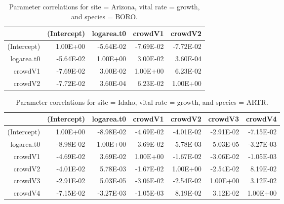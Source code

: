 \documentclass[12pt,]{article}
\begin{document}
\begin{table}[ht]
\centering
\caption{Parameter correlations for site = Arizona, vital rate = growth, and species = BORO.} 
\begin{tabular}{rrrrr}
  \hline
 & (Intercept) & logarea.t0 & crowdV1 & crowdV2 \\ 
  \hline
(Intercept) & 1.00E+00 & -5.64E-02 & -7.69E-02 & -7.72E-02 \\ 
  logarea.t0 & -5.64E-02 & 1.00E+00 & 3.00E-02 & 3.60E-04 \\ 
  crowdV1 & -7.69E-02 & 3.00E-02 & 1.00E+00 & 6.23E-02 \\ 
  crowdV2 & -7.72E-02 & 3.60E-04 & 6.23E-02 & 1.00E+00 \\ 
   \hline
\end{tabular}
\end{table}

\begin{table}[ht]
\centering
\caption{Parameter correlations for site = Idaho, vital rate = growth, and species = ARTR.} 
\begin{tabular}{rrrrrrr}
  \hline
 & (Intercept) & logarea.t0 & crowdV1 & crowdV2 & crowdV3 & crowdV4 \\ 
  \hline
(Intercept) & 1.00E+00 & -8.98E-02 & -4.69E-02 & -4.01E-02 & -2.91E-02 & -7.15E-02 \\ 
  logarea.t0 & -8.98E-02 & 1.00E+00 & 3.69E-02 & 5.78E-03 & 5.03E-05 & -3.27E-03 \\ 
  crowdV1 & -4.69E-02 & 3.69E-02 & 1.00E+00 & -1.67E-02 & -3.06E-02 & -1.05E-03 \\ 
  crowdV2 & -4.01E-02 & 5.78E-03 & -1.67E-02 & 1.00E+00 & -2.54E-02 & 8.19E-02 \\ 
  crowdV3 & -2.91E-02 & 5.03E-05 & -3.06E-02 & -2.54E-02 & 1.00E+00 & 3.12E-02 \\ 
  crowdV4 & -7.15E-02 & -3.27E-03 & -1.05E-03 & 8.19E-02 & 3.12E-02 & 1.00E+00 \\ 
   \hline
\end{tabular}
\end{table}

\newpage{}
\end{document}
